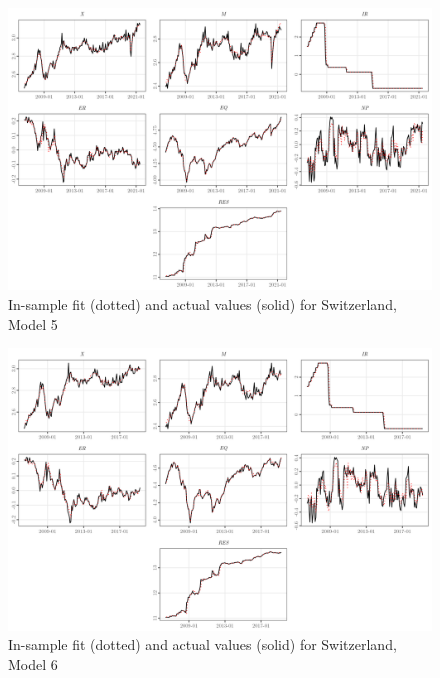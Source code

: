 \documentclass[a4paper, twoside]{templates/ociamthesis}
\begin{document}
\begin{figure}[!ht]

{\centering \includegraphics[width=0.99\columnwidth]{figure/g.model5t.CH} 

}

\caption{In-sample fit (dotted) and actual values (solid) for Switzerland, Model 5}\label{fig:Figure5FITCH5}
\end{figure}

\begin{figure}[!ht]

{\centering \includegraphics[width=0.99\columnwidth]{figure/g.model6t.CH} 

}

\caption{In-sample fit (dotted) and actual values (solid) for Switzerland, Model 6}\label{fig:Figure5FITCH6}
\end{figure}

\clearpage
\end{document}
